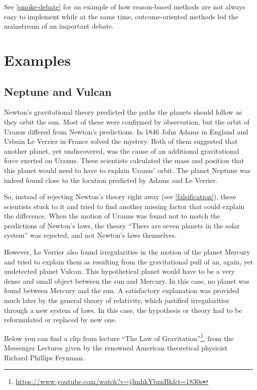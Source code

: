 \documentclass[
  12pt,
]{book}
\DeclareRobustCommand{\href}[2]{#2\footnote{\url{#1}}}
\begin{document}
See \ref{smoke-debate} for an example of how reason-based methods are not always easy to implement while at the same time, outcome-oriented methods led the mainstream of an important debate.

\newpage

\section{Examples}\label{examples}

\subsection{Neptune and Vulcan}\label{neptune-vulcan}

Newton's gravitational theory predicted the paths the planets should follow as they orbit the sun. Most of these were confirmed by observation, but the orbit of Uranus differed from Newton's predictions. In 1846 John Adams in England and Urbain Le Verrier in France solved the mystery. Both of them suggested that another planet, yet undiscovered, was the cause of an additional gravitational force exerted on Uranus. These scientists calculated the mass and position that this planet would need to have to explain Uranus' orbit. The planet Neptune was indeed found close to the location predicted by Adams and Le Verrier.

So, instead of rejecting Newton's theory right away (see \ref{falsification}), these scientists stuck to it and tried to find another missing factor that could explain the difference. When the motion of Uranus was found not to match the predictions of Newton's laws, the theory ``There are seven planets in the solar system'' was rejected, and not Newton's laws themselves.

However, Le Verrier also found irregularities in the motion of the planet Mercury and tried to explain them as resulting from the gravitational pull of an, again, yet undetected planet Vulcan. This hypothetical planet would have to be a very dense and small object between the sun and Mercury. In this case, no planet was found between Mercury and the sun. A satisfactory explanation was provided much later by the general theory of relativity, which justified irregularities through a new system of laws. In this case, the hypothesis or theory had to be reformulated or replaced by new one.

Below you can find a \href{https://www.youtube.com/watch?v=j3mhkYbznBk&t=1830s}{clip from lecture ``The Law of Gravitation''}, from the Messenger Lectures given by the renowned American theoretical physicist Richard Phillips Feynman.
\end{document}
